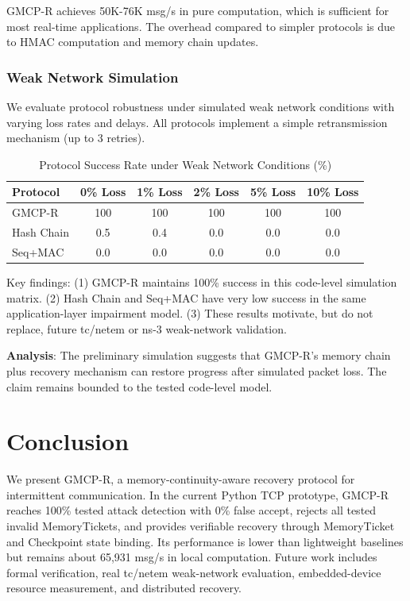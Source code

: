 \documentclass[conference]{IEEEtran}
\begin{document}
GMCP-R achieves 50K-76K msg/s in pure computation, which is sufficient for most real-time applications. The overhead compared to simpler protocols is due to HMAC computation and memory chain updates.

\subsubsection{Weak Network Simulation}

We evaluate protocol robustness under simulated weak network conditions with varying loss rates and delays. All protocols implement a simple retransmission mechanism (up to 3 retries).

\begin{table}[t]
\centering
\caption{Protocol Success Rate under Weak Network Conditions (\%)}
\begin{tabular}{lccccc}
\toprule
Protocol & 0\% Loss & 1\% Loss & 2\% Loss & 5\% Loss & 10\% Loss \\
\midrule
GMCP-R & 100 & 100 & 100 & 100 & 100 \\
Hash Chain & 0.5 & 0.4 & 0.0 & 0.0 & 0.0 \\
Seq+MAC & 0.0 & 0.0 & 0.0 & 0.0 & 0.0 \\
\bottomrule
\end{tabular}
\label{tab:weak_network}
\end{table}

Key findings: (1) GMCP-R maintains 100\% success in this code-level simulation matrix. (2) Hash Chain and Seq+MAC have very low success in the same application-layer impairment model. (3) These results motivate, but do not replace, future tc/netem or ns-3 weak-network validation.

\textbf{Analysis}: The preliminary simulation suggests that GMCP-R's memory chain plus recovery mechanism can restore progress after simulated packet loss. The claim remains bounded to the tested code-level model.

\section{Conclusion}
\label{sec:conclusion}

We present GMCP-R, a memory-continuity-aware recovery protocol for intermittent communication. In the current Python TCP prototype, GMCP-R reaches 100\% tested attack detection with 0\% false accept, rejects all tested invalid MemoryTickets, and provides verifiable recovery through MemoryTicket and Checkpoint state binding. Its performance is lower than lightweight baselines but remains about 65,931 msg/s in local computation. Future work includes formal verification, real tc/netem weak-network evaluation, embedded-device resource measurement, and distributed recovery.



\end{document}
